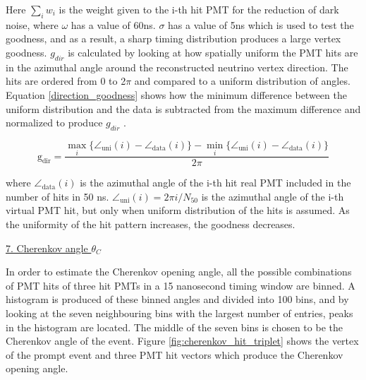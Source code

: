 Here $\sum_{i} w_{i}$ is the weight given to the i-th hit PMT for the reduction of dark noise, where $\omega$ has a value of 60ns. $\sigma$ has a value of 5ns which is used to test the goodness, and as a result, a sharp timing distribution produces a large vertex goodness. $g_{dir}$ is calculated by looking at how spatially uniform the PMT hits are in the azimuthal angle around the reconstructed neutrino vertex direction. The hits are ordered from 0 to 2$\pi$ and compared to a uniform distribution of angles. Equation \ref{direction_goodness} shows how the minimum difference between the uniform distribution and the data is subtracted from the maximum difference and normalized to produce $g_{dir}$ .

\begin{equation}
    \mathrm{g}_{\mathrm{dir}}=\frac{\max _{i}\{\angle_{\mathrm{uni}}(i)-\angle_{\mathrm{data}}(i)\}-\min _{i}\{\angle_{\mathrm{uni}}(i)-\angle_{\mathrm{data}}(i)\}}{2 \pi}
\label{direction_goodness}
\end{equation}

where $\angle_{\mathrm{data}}(i)$ is the azimuthal angle of the i-th hit real PMT included in the number of hits in 50 ns. $\angle_{\mathrm{uni}}(i)=2 \pi i / N_{50}$ is the azimuthal angle of the i-th virtual PMT hit, but only when uniform distribution of the hits is assumed. As the uniformity of the hit pattern increases, the goodness decreases. 
 


\noindent
\underline{7. Cherenkov angle $\theta_{C}$}\\
\noindent

In order to estimate the Cherenkov opening angle, all the possible combinations of PMT hits of three hit PMTs in a 15 nanosecond timing window are binned. A histogram is produced of these binned angles and divided into 100 bins, and by looking at the seven neighbouring bins with the largest number of entries, peaks in the histogram are located. The middle of the seven bins is chosen to be the Cherenkov angle of the event. Figure \ref{fig:cherenkov_hit_triplet} shows the vertex of the prompt event and three PMT hit vectors which produce the Cherenkov opening angle. 

